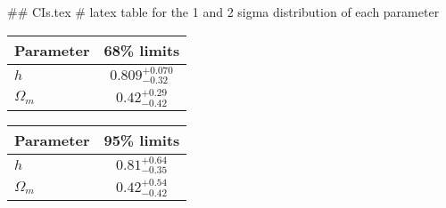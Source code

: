 ## CIs.tex
# latex table for the 1 and 2 sigma distribution of each parameter

\begin{tabular} { l  c}
 Parameter &  68\% limits\\
\hline
{\boldmath$h              $} & $0.809^{+0.070}_{-0.32}    $\\
{\boldmath$\Omega_m       $} & $0.42^{+0.29}_{-0.42}      $\\
\hline
\end{tabular}

\begin{tabular} { l  c}
 Parameter &  95\% limits\\
\hline
{\boldmath$h              $} & $0.81^{+0.64}_{-0.35}      $\\
{\boldmath$\Omega_m       $} & $0.42^{+0.54}_{-0.42}      $\\
\hline
\end{tabular}
